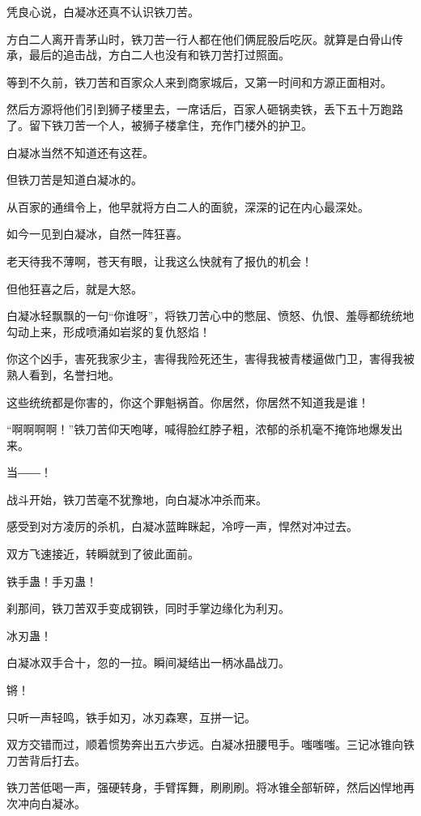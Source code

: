 
\begin{this_body}

凭良心说，白凝冰还真不认识铁刀苦。

方白二人离开青茅山时，铁刀苦一行人都在他们俩屁股后吃灰。就算是白骨山传承，最后的追击战，方白二人也没有和铁刀苦打过照面。

等到不久前，铁刀苦和百家众人来到商家城后，又第一时间和方源正面相对。

然后方源将他们引到狮子楼里去，一席话后，百家人砸锅卖铁，丢下五十万跑路了。留下铁刀苦一个人，被狮子楼拿住，充作门楼外的护卫。

白凝冰当然不知道还有这茬。

但铁刀苦是知道白凝冰的。

从百家的通缉令上，他早就将方白二人的面貌，深深的记在内心最深处。

如今一见到白凝冰，自然一阵狂喜。

老天待我不薄啊，苍天有眼，让我这么快就有了报仇的机会！

但他狂喜之后，就是大怒。

白凝冰轻飘飘的一句“你谁呀”，将铁刀苦心中的憋屈、愤怒、仇恨、羞辱都统统地勾动上来，形成喷涌如岩浆的复仇怒焰！

你这个凶手，害死我家少主，害得我险死还生，害得我被青楼逼做门卫，害得我被熟人看到，名誉扫地。

这些统统都是你害的，你这个罪魁祸首。你居然，你居然不知道我是谁！

“啊啊啊啊！”铁刀苦仰天咆哮，喊得脸红脖子粗，浓郁的杀机毫不掩饰地爆发出来。

当――！

战斗开始，铁刀苦毫不犹豫地，向白凝冰冲杀而来。

感受到对方凌厉的杀机，白凝冰蓝眸眯起，冷哼一声，悍然对冲过去。

双方飞速接近，转瞬就到了彼此面前。

铁手蛊！手刃蛊！

刹那间，铁刀苦双手变成钢铁，同时手掌边缘化为利刃。

冰刃蛊！

白凝冰双手合十，忽的一拉。瞬间凝结出一柄冰晶战刀。

锵！

只听一声轻鸣，铁手如刃，冰刃森寒，互拼一记。

双方交错而过，顺着惯势奔出五六步远。白凝冰扭腰甩手。嗤嗤嗤。三记冰锥向铁刀苦背后打去。

铁刀苦低喝一声，强硬转身，手臂挥舞，刷刷刷。将冰锥全部斩碎，然后凶悍地再次冲向白凝冰。


\end{this_body}
